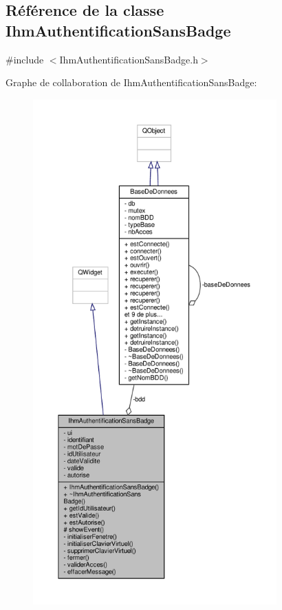 \hypertarget{class_ihm_authentification_sans_badge}{}\subsection{Référence de la classe Ihm\+Authentification\+Sans\+Badge}
\label{class_ihm_authentification_sans_badge}


{\ttfamily \#include $<$Ihm\+Authentification\+Sans\+Badge.\+h$>$}



Graphe de collaboration de Ihm\+Authentification\+Sans\+Badge\+:\nopagebreak
\begin{figure}[H]
\begin{center}
\leavevmode
\includegraphics[height=550pt]{class_ihm_authentification_sans_badge__coll__graph}
\end{center}
\end{figure}
